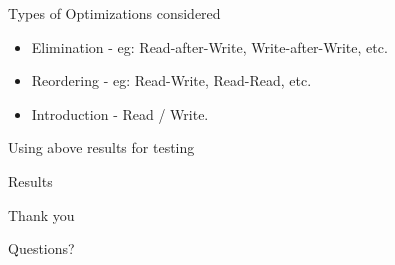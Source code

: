 \documentclass[notes, xcolor=dvipsnames]{beamer}
\begin{document}
    \begin{frame}{Types of Optimizations considered}

        \begin{itemize}
            \item Elimination - eg: Read-after-Write, Write-after-Write, etc.
            \item Reordering - eg: Read-Write, Read-Read, etc.
            \item Introduction - Read / Write. 
        \end{itemize}
        
    \end{frame}

    \begin{frame}{Using above results for testing}
        
    \end{frame}

    \begin{frame}{Results}
        

    \end{frame}

    \begin{frame}{Thank you}

        Questions?

    \end{frame}
\end{document}
